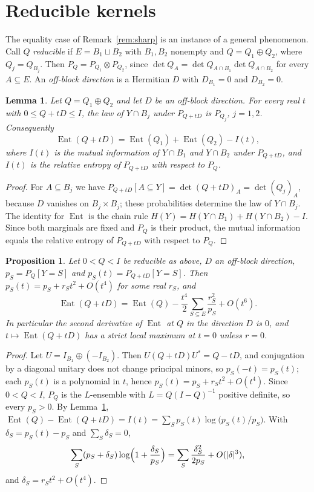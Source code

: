 \documentclass[11pt]{amsart}
\newtheorem{lemma}[theorem]{Lemma}
\newtheorem{proposition}[theorem]{Proposition}
\theoremstyle{remark}
\numberwithin{equation}{section}
\newcommand{\Ent}{\operatorname{Ent}}
\begin{document}
\section{Reducible kernels}\label{sec:reducible}

The equality case of Remark~\ref{rem:sharp} is an instance of a general phenomenon. Call $Q$ \emph{reducible} if $E=B_1\sqcup B_2$ with $B_1,B_2$ nonempty and $Q=Q_1\oplus Q_2$, where $Q_j=Q_{B_j}$. Then $P_Q=P_{Q_1}\otimes P_{Q_2}$, since $\det Q_A=\det Q_{A\cap B_1}\det Q_{A\cap B_2}$ for every $A\subseteq E$. An \emph{off-block direction} is a Hermitian $D$ with $D_{B_1}=0$ and $D_{B_2}=0$.

\begin{lemma}\label{lem:marg}
Let $Q=Q_1\oplus Q_2$ and let $D$ be an off-block direction. For every real $t$ with $0\le Q+tD\le I$, the law of $Y\cap B_j$ under $P_{Q+tD}$ is $P_{Q_j}$, $j=1,2$. Consequently
\[
\Ent(Q+tD)=\Ent(Q_1)+\Ent(Q_2)-I(t),
\]
where $I(t)$ is the mutual information of $Y\cap B_1$ and $Y\cap B_2$ under $P_{Q+tD}$, and $I(t)$ is the relative entropy of $P_{Q+tD}$ with respect to $P_Q$.
\end{lemma}

\begin{proof}
For $A\subseteq B_j$ we have $P_{Q+tD}[A\subseteq Y]=\det(Q+tD)_A=\det(Q_j)_A$, because $D$ vanishes on $B_j\times B_j$; these probabilities determine the law of $Y\cap B_j$. The identity for $\Ent$ is the chain rule $H(Y)=H(Y\cap B_1)+H(Y\cap B_2)-I$. Since both marginals are fixed and $P_Q$ is their product, the mutual information equals the relative entropy of $P_{Q+tD}$ with respect to $P_Q$.
\end{proof}

\begin{proposition}\label{prop:reducible}
Let $0<Q<I$ be reducible as above, $D$ an off-block direction, $p_S=P_Q[Y=S]$ and $p_S(t)=P_{Q+tD}[Y=S]$. Then $p_S(t)=p_S+r_St^2+O(t^4)$ for some real $r_S$, and
\[
\Ent(Q+tD)=\Ent(Q)-\frac{t^4}{2}\sum_{S\subseteq E}\frac{r_S^2}{p_S}+O(t^6).
\]
In particular the second derivative of $\Ent$ at $Q$ in the direction $D$ is $0$, and $t\mapsto\Ent(Q+tD)$ has a strict local maximum at $t=0$ unless $r=0$.
\end{proposition}

\begin{proof}
Let $U=I_{B_1}\oplus(-I_{B_2})$. Then $U(Q+tD)U^*=Q-tD$, and conjugation by a diagonal unitary does not change principal minors, so $p_S(-t)=p_S(t)$; each $p_S(t)$ is a polynomial in $t$, hence $p_S(t)=p_S+r_St^2+O(t^4)$. Since $0<Q<I$, $P_Q$ is the $L$-ensemble with $L=Q(I-Q)^{-1}$ positive definite, so every $p_S>0$. By Lemma~\ref{lem:marg}, $\Ent(Q)-\Ent(Q+tD)=I(t)=\sum_S p_S(t)\log\bigl(p_S(t)/p_S\bigr)$. With $\delta_S=p_S(t)-p_S$ and $\sum_S\delta_S=0$,
\[
\sum_S(p_S+\delta_S)\log\Bigl(1+\frac{\delta_S}{p_S}\Bigr)=\sum_S\frac{\delta_S^2}{2p_S}+O(|\delta|^3),
\]
and $\delta_S=r_St^2+O(t^4)$.
\end{proof}
\end{document}
